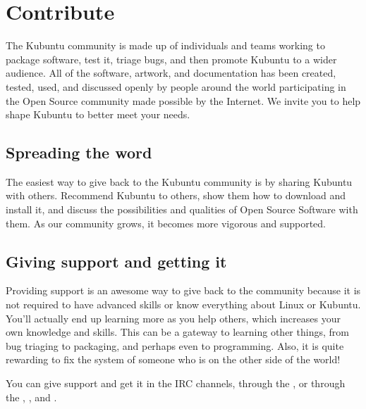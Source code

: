 \documentclass[letterpaper,10pt,english]{sphinxmanual}
\begin{document}
\chapter{Contribute}
\label{\detokenize{docs/contribute:contribute}}\label{\detokenize{docs/contribute:contribute-link}}\label{\detokenize{docs/contribute::doc}}
\sphinxAtStartPar
The Kubuntu community is made up of individuals and teams working to package software, test it, triage bugs, and then promote Kubuntu to a wider audience. All of the software, artwork, and documentation has been created, tested, used, and discussed openly by people around the world participating in the Open Source community made possible by the Internet. We invite you to help shape Kubuntu to better meet your needs.


\section{Spreading the word}
\label{\detokenize{docs/contribute:spreading-the-word}}
\sphinxAtStartPar
The easiest way to give back to the Kubuntu community is by sharing Kubuntu with others. Recommend Kubuntu to others, show them how to download and install it, and discuss the possibilities and qualities of Open Source Software with them. As our community grows, it becomes more vigorous and supported.


\section{Giving support and getting it}
\label{\detokenize{docs/contribute:giving-support-and-getting-it}}
\sphinxAtStartPar
Providing support is an awesome way to give back to the community because it is not required to have advanced skills or know everything about Linux or Kubuntu. You’ll actually end up learning more as you help others, which increases your own knowledge and skills. This can be a gateway to learning other things, from bug triaging to packaging, and perhaps even to programming. Also, it is quite rewarding to fix the system of someone who is on the other side of the world!

\sphinxAtStartPar
You can give support and get it in the IRC channels, through the , or through the , , and .
\end{document}
